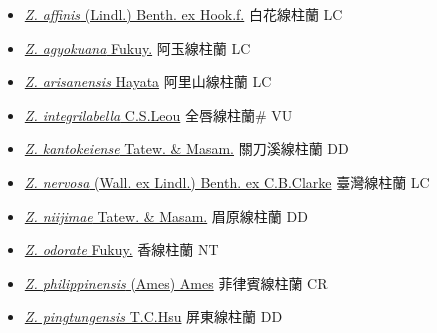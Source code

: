 \begin{itemize}
  \begin{itemize}
        \item[] \href{http://www.theplantlist.org/tpl1.1/search?q=Zeuxine+affinis}{\textit{Z. affinis} (Lindl.) Benth. ex Hook.f.}   白花線柱蘭 LC
        \item[] \href{http://www.theplantlist.org/tpl1.1/search?q=Zeuxine+agyokuana}{\textit{Z. agyokuana} Fukuy.}   阿玉線柱蘭 LC
        \item[] \href{http://www.theplantlist.org/tpl1.1/search?q=Zeuxine+arisanensis}{\textit{Z. arisanensis} Hayata}     阿里山線柱蘭 LC
        \item[] \href{http://www.theplantlist.org/tpl1.1/search?q=Zeuxine+integrilabella}{\textit{Z. integrilabella} C.S.Leou}   全唇線柱蘭\# VU
        \item[] \href{http://www.theplantlist.org/tpl1.1/search?q=Zeuxine+kantokeiense}{\textit{Z. kantokeiense} Tatew. \& Masam.}   關刀溪線柱蘭 DD
        \item[] \href{http://www.theplantlist.org/tpl1.1/search?q=Zeuxine+nervosa}{\textit{Z. nervosa} (Wall. ex Lindl.) Benth. ex C.B.Clarke}   臺灣線柱蘭 LC
        \item[] \href{http://www.theplantlist.org/tpl1.1/search?q=Zeuxine+niijimae}{\textit{Z. niijimae} Tatew. \& Masam.}   眉原線柱蘭 DD
        \item[] \href{http://www.theplantlist.org/tpl1.1/search?q=Zeuxine+odorate}{\textit{Z. odorate} Fukuy.}   香線柱蘭 NT
        \item[] \href{http://www.theplantlist.org/tpl1.1/search?q=Zeuxine+philippinensis}{\textit{Z. philippinensis} (Ames) Ames}   菲律賓線柱蘭 CR
        \item[] \href{http://www.theplantlist.org/tpl1.1/search?q=Zeuxine+pingtungensis}{\textit{Z. pingtungensis} T.C.Hsu}   屏東線柱蘭 DD

\end{itemize}
\end{itemize}
